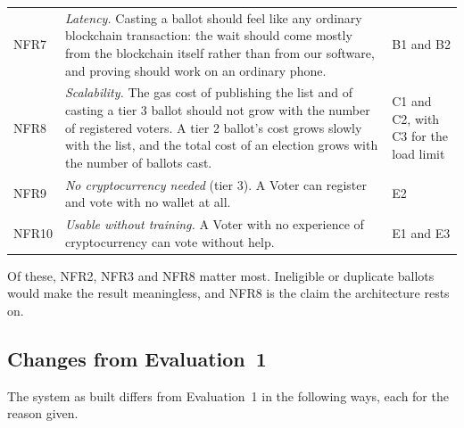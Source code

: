 \begin{longtable}{@{}>{\RaggedRight\arraybackslash\small}p{1.5cm}>{\RaggedRight\arraybackslash\small}p{10.4cm}>{\RaggedRight\arraybackslash\small}p{5.4cm}@{}}
  \addlinespace[2pt]
  NFR7 & \emph{Latency.} Casting a ballot should feel like any ordinary blockchain transaction: the wait should come mostly from the blockchain itself rather than from our software, and proving should work on an ordinary phone. & B1 and B2 \\
  \addlinespace[2pt]
  NFR8 & \emph{Scalability.} The gas cost of publishing the list and of casting a tier 3 ballot should not grow with the number of registered voters. A tier 2 ballot's cost grows slowly with the list, and the total cost of an election grows with the number of ballots cast. & C1 and C2, with C3 for the load limit \\
  \addlinespace[2pt]
  NFR9 & \emph{No cryptocurrency needed} (tier 3). A Voter can register and vote with no wallet at all. & E2 \\
  \addlinespace[2pt]
  NFR10 & \emph{Usable without training.} A Voter with no experience of cryptocurrency can vote without help. & E1 and E3 \\
\end{longtable}

Of these, NFR2, NFR3 and NFR8 matter most. Ineligible or duplicate ballots would
make the result meaningless, and NFR8 is the claim the architecture rests on.

\subsection{Changes from Evaluation~1}\label{sec:req-changes}

The system as built differs from Evaluation~1 in the following ways, each for
the reason given.

